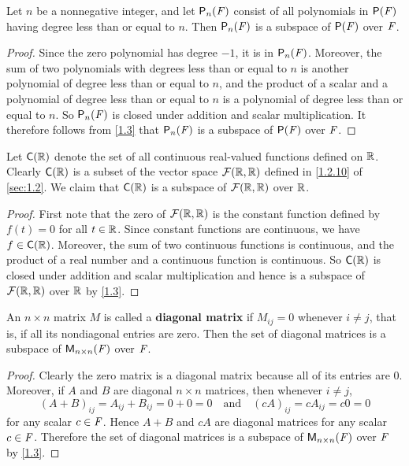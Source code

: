 \begin{eg}\label{1.3.6}
	Let \(n\) be a nonnegative integer, and let \(\ps[n]{\F}\) consist of all polynomials in \(\ps{\F}\) having degree less than or equal to \(n\).
	Then \(\ps[n]{\F}\) is a subspace of \(\ps{\F}\) over \(\mathit{F}\).
\end{eg}

\begin{proof}
	Since the zero polynomial has degree \(-1\), it is in \(\ps[n]{\F}\).
	Moreover, the sum of two polynomials with degrees less than or equal to \(n\) is another polynomial of degree less than or equal to \(n\), and the product of a scalar and a polynomial of degree less than or equal to \(n\) is a polynomial of degree less than or equal to \(n\).
	So \(\ps[n]{\F}\) is closed under addition and scalar multiplication.
	It therefore follows from \cref{1.3} that \(\ps[n]{\F}\) is a subspace of \(\ps{\F}\) over \(\mathit{F}\).
\end{proof}

\begin{eg}\label{1.3.7}
	Let \(\cfs{\R}\) denote the set of all continuous real-valued functions defined on \(\mathbb{R}\).
	Clearly \(\cfs{\R}\) is a subset of the vector space \(\fs{\R}{\R}\) defined in \cref{1.2.10} of \cref{sec:1.2}.
	We claim that \(\cfs{\R}\) is a subspace of \(\fs{\R}{\R}\) over \(\mathbb{R}\).
\end{eg}

\begin{proof}
	First note that the zero of \(\fs{\R}{\R}\) is the constant function defined by \(f(t) = 0\) for all \(t \in \mathbb{R}\).
	Since constant functions are continuous, we have \(f \in \cfs{\R}\).
	Moreover, the sum of two continuous functions is continuous, and the product of a real number and a continuous function is continuous.
	So \(\cfs{\R}\) is closed under addition and scalar multiplication and hence is a subspace of \(\fs{\R}{\R}\) over \(\mathbb{R}\) by \cref{1.3}.
\end{proof}

\begin{eg}\label{1.3.8}
	An \(n \times n\) matrix \(M\) is called a \textbf{diagonal matrix} if \(M_{i j} = 0\) whenever \(i \neq j\), that is, if all its nondiagonal entries are zero.
	Then the set of diagonal matrices is a subspace of \(\mathsf{M}_{{n} \times n}({\mathit{F}})\) over \(\mathit{F}\).
\end{eg}

\begin{proof}
	Clearly the zero matrix is a diagonal matrix because all of its entries are \(0\).
	Moreover, if \(A\) and \(B\) are diagonal \(n \times n\) matrices, then whenever \(i \neq j\),
	\[
		(A + B)_{i j} = A_{i j} + B_{i j} = 0 + 0 = 0 \quad \text{and} \quad (cA)_{i j} = cA_{i j} = c0 = 0
	\]
	for any scalar \(c \in \mathit{F}\).
	Hence \(A + B\) and \(cA\) are diagonal matrices for any scalar \(c \in \mathit{F}\).
	Therefore the set of diagonal matrices is a subspace of \(\mathsf{M}_{{n} \times n}({\mathit{F}})\) over \(\mathit{F}\) by \cref{1.3}.
\end{proof}

